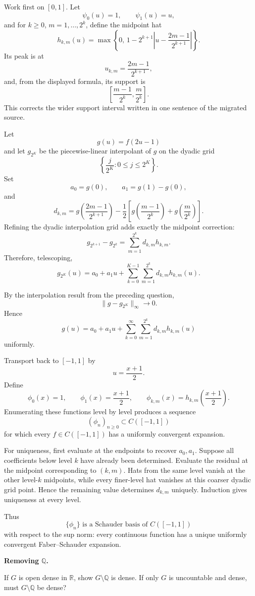 \begin{solution}
Work first on \([0,1]\). Let
\[
\psi_0(u)=1,\qquad \psi_1(u)=u,
\]
and for \(k\ge0\), \(m=1,\ldots,2^k\), define the midpoint hat
\[
h_{k,m}(u)
=
\max\left\{
0,\,
1-2^{k+1}
\left|
u-\frac{2m-1}{2^{k+1}}
\right|
\right\}.
\]
Its peak is at
\[
u_{k,m}=\frac{2m-1}{2^{k+1}},
\]
and, from the displayed formula, its support is
\[
\boxed{
\left[
\frac{m-1}{2^k},
\frac{m}{2^k}
\right].
}
\]
This corrects the wider support interval written in one sentence of the migrated source.

Let
\[
g(u)=f(2u-1)
\]
and let \(g_{2^K}\) be the piecewise-linear interpolant of \(g\) on the dyadic grid
\[
\left\{\frac{j}{2^K}:0\le j\le2^K\right\}.
\]
Set
\[
a_0=g(0),
\qquad
a_1=g(1)-g(0),
\]
and
\[
d_{k,m}
=
g\left(\frac{2m-1}{2^{k+1}}\right)
-
\frac12
\left[
g\left(\frac{m-1}{2^k}\right)
+
g\left(\frac{m}{2^k}\right)
\right].
\]
Refining the dyadic interpolation grid adds exactly the midpoint correction:
\[
g_{2^{k+1}}-g_{2^k}
=
\sum_{m=1}^{2^k}
d_{k,m}h_{k,m}.
\]
Therefore, telescoping,
\[
g_{2^K}(u)
=
a_0+a_1u
+
\sum_{k=0}^{K-1}
\sum_{m=1}^{2^k}
d_{k,m}h_{k,m}(u).
\]

By the interpolation result from the preceding question,
\[
\|g-g_{2^K}\|_\infty\to0.
\]
Hence
\[
g(u)
=
a_0+a_1u
+
\sum_{k=0}^{\infty}
\sum_{m=1}^{2^k}
d_{k,m}h_{k,m}(u)
\]
uniformly.

Transport back to \([-1,1]\) by
\[
u=\frac{x+1}{2}.
\]
Define
\[
\phi_0(x)=1,\qquad
\phi_1(x)=\frac{x+1}{2},
\qquad
\phi_{k,m}(x)=h_{k,m}\left(\frac{x+1}{2}\right).
\]
Enumerating these functions level by level produces a sequence
\[
(\phi_n)_{n\ge0}
\subset C([-1,1])
\]
for which every \(f\in C([-1,1])\) has a uniformly convergent expansion.

For uniqueness, first evaluate at the endpoints to recover \(a_0,a_1\). Suppose all
coefficients below level \(k\) have already been determined. Evaluate the residual at the
midpoint corresponding to \((k,m)\). Hats from the same level vanish at the other level-\(k\)
midpoints, while every finer-level hat vanishes at this coarser dyadic grid point. Hence the
remaining value determines \(d_{k,m}\) uniquely. Induction gives uniqueness at every level.

Thus
\[
\boxed{
\{\phi_n\}
\text{ is a Schauder basis of }C([-1,1])
}
\]
with respect to the sup norm: every continuous function has a unique uniformly convergent
Faber--Schauder expansion.
\end{solution}


\begin{problem}[CP-II-0169]
\label{prob:cp-ii-0169}
\textbf{Removing $\mathbb Q$.}

\hspace*{1.5em}If $G$ is open dense in $\mathbb R$, show $G\setminus\mathbb Q$ is dense. If only $G$ is uncountable and dense, must $G\setminus\mathbb Q$ be dense?
\end{problem}


